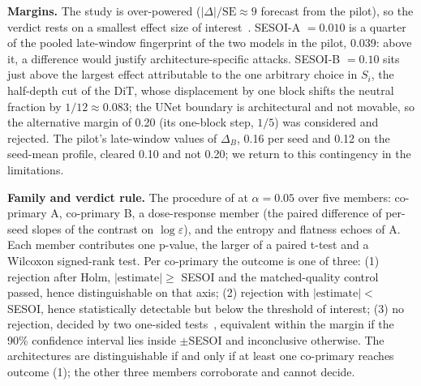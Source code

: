 \documentclass{article}
\begin{document}
\textbf{Margins.} The study is over-powered ($|\Delta|/\mathrm{SE} \approx 9$ forecast from the pilot), so the verdict rests on a smallest effect size of interest~\cite{lakens2017equivalence}. SESOI-A $= 0.010$ is a quarter of the pooled late-window fingerprint of the two models in the pilot, 0.039: above it, a difference would justify architecture-specific attacks. SESOI-B $= 0.10$ sits just above the largest effect attributable to the one arbitrary choice in $S_i$, the half-depth cut of the DiT, whose displacement by one block shifts the neutral fraction by $1/12 \approx 0.083$; the UNet boundary is architectural and not movable, so the alternative margin of 0.20 (its one-block step, $1/5$) was considered and rejected. The pilot's late-window values of $\Delta_B$, 0.16 per seed and 0.12 on the seed-mean profile, cleared 0.10 and not 0.20; we return to this contingency in the limitations.

\textbf{Family and verdict rule.} The procedure of \citet{holm1979simple} at $\alpha = 0.05$ over five members: co-primary A, co-primary B, a dose-response member (the paired difference of per-seed slopes of the contrast on $\log \varepsilon$), and the entropy and flatness echoes of A. Each member contributes one p-value, the larger of a paired t-test and a Wilcoxon signed-rank test. Per co-primary the outcome is one of three: (1) rejection after Holm, $|\mathrm{estimate}| \ge$ SESOI and the matched-quality control passed, hence distinguishable on that axis; (2) rejection with $|\mathrm{estimate}| <$ SESOI, hence statistically detectable but below the threshold of interest; (3) no rejection, decided by two one-sided tests~\cite{schuirmann1987comparison}, equivalent within the margin if the 90\% confidence interval lies inside $\pm$SESOI and inconclusive otherwise. The architectures are distinguishable if and only if at least one co-primary reaches outcome (1); the other three members corroborate and cannot decide.
\end{document}
